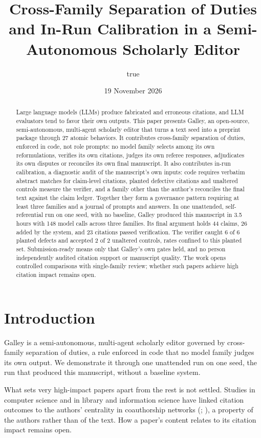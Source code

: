 \documentclass[
]{article}
\title{Cross-Family Separation of Duties and In-Run Calibration in a
Semi-Autonomous Scholarly Editor}
\author{true}
\date{19 November 2026}
\begin{document}
\maketitle
\begin{abstract}
Large language models (LLMs) produce fabricated and erroneous citations,
and LLM evaluators tend to favor their own outputs. This paper presents
Galley, an open-source, semi-autonomous, multi-agent scholarly editor
that turns a text seed into a preprint package through 27 atomic
behaviors. It contributes cross-family separation of duties, enforced in
code, not role prompts: no model family selects among its own
reformulations, verifies its own citations, judges its own referee
responses, adjudicates its own disputes or reconciles its own final
manuscript. It also contributes in-run calibration, a diagnostic audit
of the manuscript's own inputs: code requires verbatim abstract matches
for claim-level citations, planted defective citations and unaltered
controls measure the verifier, and a family other than the author's
reconciles the final text against the claim ledger. Together they form a
governance pattern requiring at least three families and a journal of
prompts and answers. In one unattended, self-referential run on one
seed, with no baseline, Galley produced this manuscript in 3.5 hours
with 148 model calls across three families. Its final argument holds 44
claims, 26 added by the system, and 23 citations passed verification.
The verifier caught 6 of 6 planted defects and accepted 2 of 2 unaltered
controls, rates confined to this planted set. Submission-ready means
only that Galley's own gates held, and no person independently audited
citation support or manuscript quality. The work opens controlled
comparisons with single-family review; whether such papers achieve high
citation impact remains open.
\end{abstract}

\section{Introduction}\label{introduction}

Galley is a semi-autonomous, multi-agent scholarly editor governed by
cross-family separation of duties, a rule enforced in code that no model
family judges its own output. We demonstrate it through one unattended
run on one seed, the run that produced this manuscript, without a
baseline system.

What sets very high-impact papers apart from the rest is not settled.
Studies in computer science and in library and information science have
linked citation outcomes to the authors' centrality in coauthorship
networks (;
), a property
of the authors rather than of the text. How a paper's content relates to
its citation impact remains open.
\end{document}
